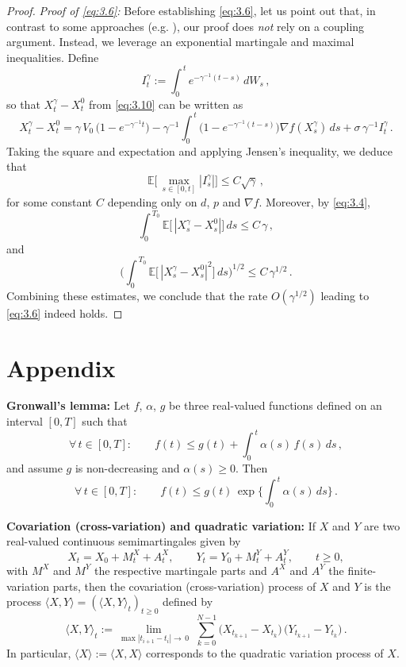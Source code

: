 \documentclass[12pt]{article}
\numberwithin{equation}{section}
\theoremstyle{remark}
\begin{document}
\begin{proof}
\medskip\noindent \textit{Proof of \eqref{eq:3.6}:} Before establishing \eqref{eq:3.6}, let us point out that, in contrast to some approaches (e.g. \cite{f04}), our proof does \emph{not} rely on a coupling argument. Instead, we leverage an exponential martingale and maximal inequalities. Define 
\[ 
I_t^\gamma := \int_{0}^{\,t} e^{-\gamma^{-1}(t-s)}\,dW_s\,,
\] 
so that $X_t^\gamma - X_t^0$ from \eqref{eq:3.10} can be written as 
\[ 
X_t^\gamma - X_t^0 = \gamma\,V_0\,\big(1 - e^{-\gamma^{-1}t}\big) - \gamma^{-1}\int_{0}^{\,t} \Big(1 - e^{-\gamma^{-1}(t-s)}\Big)\nabla f(X_s^\gamma)\,ds + \sigma\,\gamma^{-1} I_t^\gamma\,.
\] 
Taking the square and expectation and applying Jensen’s inequality, we deduce that 
\[ 
\mathbb{E}\!\Big[\,\max_{s\in[0,t]} |I_s^\gamma|\Big] \le C\sqrt{\gamma}\,,
\] 
for some constant $C$ depending only on $d$, $p$ and $\nabla f$. Moreover, by \eqref{eq:3.4}, 
\[ 
\int_{0}^{\,T_0} \mathbb{E}\!\big[\,|X_s^\gamma - X_s^0|\big]\,ds \le C\,\gamma\,,
\] 
and 
\[ 
\Bigg(\int_{0}^{\,T_0} \mathbb{E}\!\big[\,|X_s^\gamma - X_s^0|^2\big]\,ds\Bigg)^{\!1/2} \le C\,\gamma^{1/2}\,. 
\] 
Combining these estimates, we conclude that the rate $O(\gamma^{1/2})$ leading to \eqref{eq:3.6} indeed holds. 
\end{proof}

\section{Appendix}

\noindent \textbf{Gronwall’s lemma:} Let $f$, $\alpha$, $g$ be three real-valued functions defined on an interval $[0,T]$ such that 
\[ 
\forall\,t \in [0,T]: \qquad f(t) \le g(t) + \int_{0}^{\,t} \alpha(s)\,f(s)\,ds\,,
\] 
and assume $g$ is non-decreasing and $\alpha(s) \ge 0$. Then 
\[ 
\forall\,t \in [0,T]: \qquad f(t) \le g(t)\,\exp\!\Big\{\int_{0}^{\,t} \alpha(s)\,ds\Big\}\,. 
\]

\noindent \textbf{Covariation (cross-variation) and quadratic variation:} If $X$ and $Y$ are two real-valued continuous semimartingales given by 
\[ 
X_t = X_0 + M^X_t + A^X_t, \qquad Y_t = Y_0 + M^Y_t + A^Y_t, \qquad t \ge 0, 
\] 
with $M^X$ and $M^Y$ the respective martingale parts and $A^X$ and $A^Y$ the finite-variation parts, then the covariation (cross-variation) process of $X$ and $Y$ is the process $\langle X, Y \rangle = (\langle X,Y\rangle_t)_{t\ge0}$ defined by 
\[ 
\langle X, Y \rangle_t := \lim_{\max |t_{i+1}-t_i|\to\,0}\;\sum_{k=0}^{N-1} \big(X_{t_{k+1}} - X_{t_k}\big)\,\big(Y_{t_{k+1}} - Y_{t_k}\big)\,. 
\] 
In particular, $\langle X \rangle := \langle X, X\rangle$ corresponds to the quadratic variation process of $X$.
\end{document}
